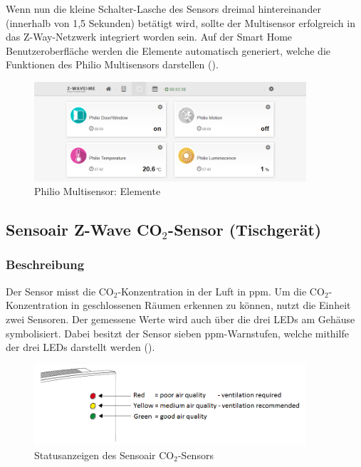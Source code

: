 Wenn nun die kleine Schalter-Lasche des Sensors dreimal hintereinander (innerhalb von 1,5 Sekunden) betätigt wird, sollte der Multisensor erfolgreich in das Z-Way-Netzwerk integriert worden sein. Auf der Smart Home Benutzeroberfläche werden die Elemente automatisch generiert, welche die Funktionen des Philio Multisensors darstellen ().

\begin{figure}[h!]
	\centering
	\includegraphics[width=0.9\textwidth]{img/Sensorevaluation/PhilioElements.png}
	\caption{Philio Multisensor: Elemente}
	\label{fig:sensorenPhilioElements}
\end{figure}

\newpage
\subsection{Sensoair Z-Wave CO$_2$-Sensor (Tischgerät)}

\subsubsection{Beschreibung}
Der Sensor misst die CO$_2$-Konzentration in der Luft in \gls{ppm}. Um die CO$_2$-Konzentration in geschlossenen Räumen erkennen zu können, nutzt die Einheit zwei Sensoren. Der gemessene Werte wird auch über die drei LEDs am Gehäuse symbolisiert. Dabei besitzt der Sensor sieben \gls{ppm}-Warnstufen, welche mithilfe der drei LEDs darstellt werden ().

\begin{figure}[h!]
	\centering
	\includegraphics[width=0.9\textwidth]{img/Sensorevaluation/Sensoair.png}
	\caption{Statusanzeigen des Sensoair CO$_2$-Sensors}
	\label{fig:sensorenSensoair}
\end{figure}



